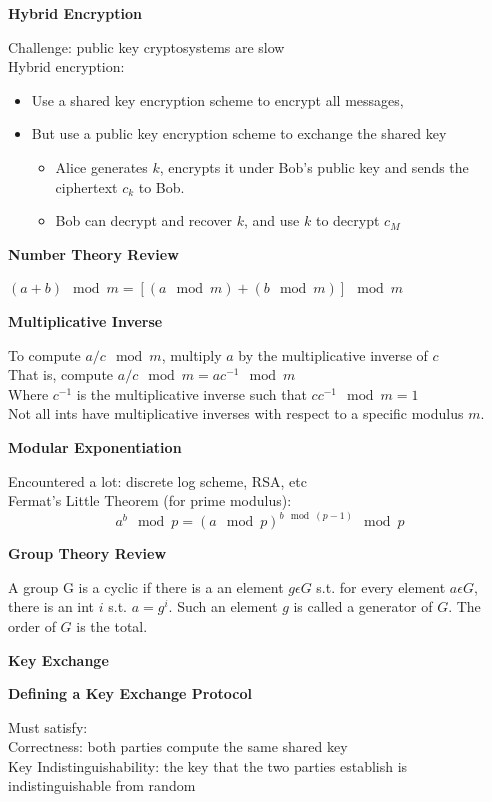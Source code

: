 \documentclass{article}
\begin{document}
\textbf{Hybrid Encryption}

Challenge: public key cryptosystems are slow\\
Hybrid encryption:\begin{itemize}
	\item Use a shared key encryption scheme to encrypt all messages,
	\item But use a public key encryption scheme to exchange the shared key\begin{itemize}
			\item Alice generates $k$, encrypts it under Bob's public key and sends the ciphertext $c_k$ to Bob.
			\item Bob can decrypt and recover $k$, and use $k$ to decrypt $c_M$
		\end{itemize}
\end{itemize}

\textbf{Number Theory Review}

$(a+b) \mod m = [(a \mod m) + (b \mod m)] \mod m$

\textbf{Multiplicative Inverse}

To compute $a/c \mod m$, multiply $a$ by the multiplicative inverse of $c$\\
That is, compute $a/c\mod m = ac^{-1}\mod m$\\
Where $c^{-1}$ is the multiplicative inverse such that $cc^{-1}\mod m=1$\\
Not all ints have multiplicative inverses with respect to a specific modulus $m$.

\textbf{Modular Exponentiation}

Encountered a lot: discrete log scheme, RSA, etc\\
Fermat's Little Theorem (for prime modulus):
\[
	a^b \mod p = (a\mod p)^{b\mod(p-1)} \mod p
\]

\textbf{Group Theory Review}

A group G is a cyclic if there is a an element $g \epsilon G$ s.t. for every element $a\epsilon G$, there is an int $i$ s.t. $a=g^i$. Such an element $g$ is called a generator of $G$. The order of $G$ is the total.

\textbf{Key Exchange}

\textbf{Defining a Key Exchange Protocol}

Must satisfy:\\
Correctness: both parties compute the same shared key\\
Key Indistinguishability: the key that the two parties establish is indistinguishable from random
\end{document}
